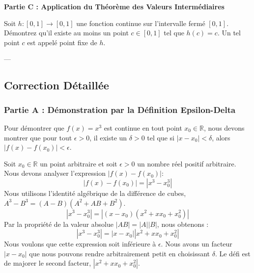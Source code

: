\documentclass[12pt,a4paper]{report}
\begin{document}
\textbf{Partie C : Application du Théorème des Valeurs Intermédiaires}

Soit $h: [0,1] \to [0,1]$ une fonction continue sur l'intervalle fermé $[0,1]$.
Démontrez qu'il existe au moins un point $c \in [0,1]$ tel que $h(c) = c$. Un tel point $c$ est appelé point fixe de $h$.

---

\subsection{Correction Détaillée}

\subsubsection{Partie A : Démonstration par la Définition Epsilon-Delta}

Pour démontrer que $f(x) = x^3$ est continue en tout point $x_0 \in \mathbb{R}$, nous devons montrer que pour tout $\epsilon > 0$, il existe un $\delta > 0$ tel que si $|x - x_0| < \delta$, alors $|f(x) - f(x_0)| < \epsilon$.

Soit $x_0 \in \mathbb{R}$ un point arbitraire et soit $\epsilon > 0$ un nombre réel positif arbitraire.
Nous devons analyser l'expression $|f(x) - f(x_0)|$:
$$
|f(x) - f(x_0)| = |x^3 - x_0^3|
$$
Nous utilisons l'identité algébrique de la différence de cubes, $A^3 - B^3 = (A - B)(A^2 + AB + B^2)$.
$$
|x^3 - x_0^3| = |(x - x_0)(x^2 + x x_0 + x_0^2)|
$$
Par la propriété de la valeur absolue $|AB| = |A||B|$, nous obtenons :
$$
|x^3 - x_0^3| = |x - x_0| |x^2 + x x_0 + x_0^2|
$$
Nous voulons que cette expression soit inférieure à $\epsilon$. Nous avons un facteur $|x - x_0|$ que nous pouvons rendre arbitrairement petit en choisissant $\delta$. Le défi est de majorer le second facteur, $|x^2 + x x_0 + x_0^2|$.
\end{document}
